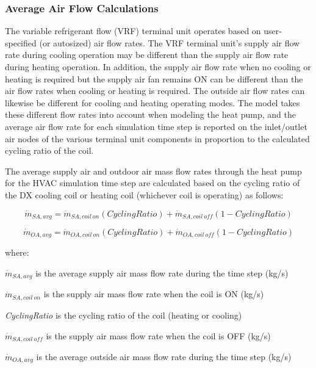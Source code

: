 \subsubsection{Average Air Flow Calculations}\label{average-air-flow-calculations}

The variable refrigerant flow (VRF) terminal unit operates based on user-specified (or autosized) air flow rates. The VRF terminal unit's supply air flow rate during cooling operation may be different than the supply air flow rate during heating operation. In addition, the supply air flow rate when no cooling or heating is required but the supply air fan remains ON can be different than the air flow rates when cooling or heating is required. The outside air flow rates can likewise be different for cooling and heating operating modes. The model takes these different flow rates into account when modeling the heat pump, and the average air flow rate for each simulation time step is reported on the inlet/outlet air nodes of the various terminal unit components in proportion to the calculated cycling ratio of the coil.

The average supply air and outdoor air mass flow rates through the heat pump for the HVAC simulation time step are calculated based on the cycling ratio of the DX cooling coil or heating coil (whichever coil is operating) as follows:

\begin{equation}
\dot{m}_{SA,avg} = \dot{m}_{SA,coil~on} \left( {CyclingRatio} \right) + \dot{m}_{SA,coil~off} \left( {1 - CyclingRatio} \right)
\end{equation}

\begin{equation}
\dot{m}_{OA,avg} = \dot{m}_{OA,coil~on} \left( {CyclingRatio} \right) + \dot{m}_{OA,coil~off} \left( {1 - CyclingRatio} \right)
\end{equation}

where:

\(\dot{m}_{SA,avg}\) is the average supply air mass flow rate during the time step (kg/s)

\(\dot{m}_{SA,coil~on}\) is the supply air mass flow rate when the coil is ON (kg/s)

\emph{CyclingRatio} is the cycling ratio of the coil (heating or cooling)

\(\dot{m}_{SA,coil~off}\) is the supply air mass flow rate when the coil is OFF (kg/s)

\(\dot{m}_{OA,avg}\) is the average outside air mass flow rate during the time step (kg/s)

